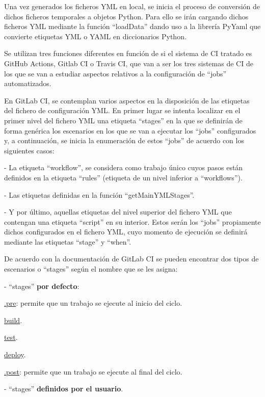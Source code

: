 Una vez generados los ficheros YML en local, se inicia el proceso de conversión de dichos ficheros temporales a objetos Python. Para ello se irán cargando dichos ficheros YML mediante la función ``loadData'' dando uso a la librería PyYaml que convierte etiquetas YML o YAML en diccionarios Python. 

Se utilizan tres funciones diferentes en función de si el sistema de CI tratado es GitHub Actions, Gitlab CI o Travis CI, que van a ser los tres sistemas de CI de los que se van a estudiar aspectos relativos a la configuración de ``jobs'' automatizados.

En GitLab CI, se contemplan varios aspectos en la disposición de las etiquetas del fichero de configuración YML. En primer lugar  se intenta localizar en el primer nivel del fichero YML una etiqueta ``stages'' en la que se definirán de forma genérica los escenarios en los que se van a ejecutar los ``jobs'' configurados y, a continuación, se inicia la enumeración de estos ``jobs'' de acuerdo con los siguientes casos:

- La etiqueta ``workflow'', se considera como trabajo único cuyos pasos están definidos en la etiqueta ``rules'' (etiqueta de un nivel inferior a ``workflows'').

- Las etiquetas definidas en la función ``getMainYMLStages''.

- Y por último, aquellas etiquetas del nivel superior del fichero YML que contengan una etiqueta ``script'' en su interior. Estos serán los ``jobs'' propiamente dichos configurados en el fichero YML, cuyo momento de ejecución se definirá mediante las etiquetas ``stage'' y ``when''.

De acuerdo con la documentación de GitLab CI \cite{stagesGitLabCI} se pueden encontrar dos tipos de escenarios o ``stages'' según el nombre que se les asigna:

- ``stages'' \textbf{por defecto}:
\begin{compactitem}
    \item \underline{.pre}: permite que un trabajo se ejecute al inicio del ciclo.
    \item \underline{build}.
    \item \underline{test}.
    \item \underline{deploy}.
    \item \underline{.post}: permite que un trabajo se ejecute al final del ciclo.
\end{compactitem}

- ``stages'' \textbf{definidos por el usuario}.

